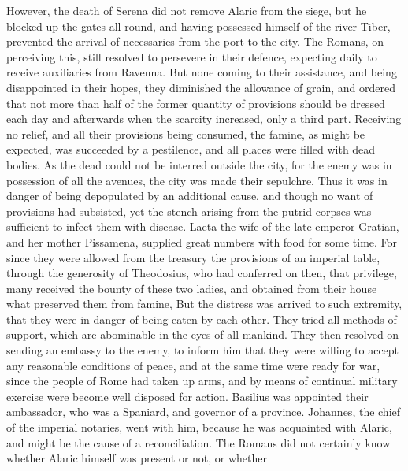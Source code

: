 However, the death of Serena did not remove Alaric from the siege, but he blocked up the gates all round, and having possessed himself of the river Tiber, prevented the arrival of necessaries from the port to the city. The Romans, on perceiving this, still resolved to persevere in their defence, expecting daily to receive auxiliaries from Ravenna. But none coming to their assistance, and being disappointed in their hopes, they diminished the allowance of grain, and ordered that not more than half of the former quantity of provisions should be dressed each day and afterwards when the scarcity increased, only a third part. Receiving no relief, and all their provisions being consumed, the famine, as might be expected, was succeeded by a pestilence, and all places were filled with dead bodies. As the dead could not be interred outside the city, for the enemy was in possession of all the avenues, the city was made their sepulchre. Thus it was in danger of being depopulated by an additional cause, and though no want of provisions had subsisted, yet the stench arising from the putrid corpses was sufficient to infect them with disease. Laeta the wife of the late emperor Gratian, and her mother Pissamena, supplied great numbers with food for some time. For since they were allowed from the treasury the provisions of an imperial table, through the generosity of Theodosius, who had conferred on then, that privilege, many received the bounty of these two ladies, and obtained from their house what preserved them from famine, But the distress was arrived to such extremity, that they were in danger of being eaten by each other. They tried all methods of support, which are abominable in the eyes of all mankind. They then resolved on sending an embassy to the enemy, to inform him that they were willing to accept any reasonable conditions of peace, and at the same time were ready for war, since the people of Rome had taken up arms, and by means of continual military exercise were become well disposed for action. Basilius was appointed their ambassador, who was a Spaniard, and governor of a province. Johannes, the chief of the imperial notaries, went with him, because he was acquainted with Alaric, and might be the cause of a reconciliation. The Romans did not certainly know whether Alaric himself was present or not, or whether
